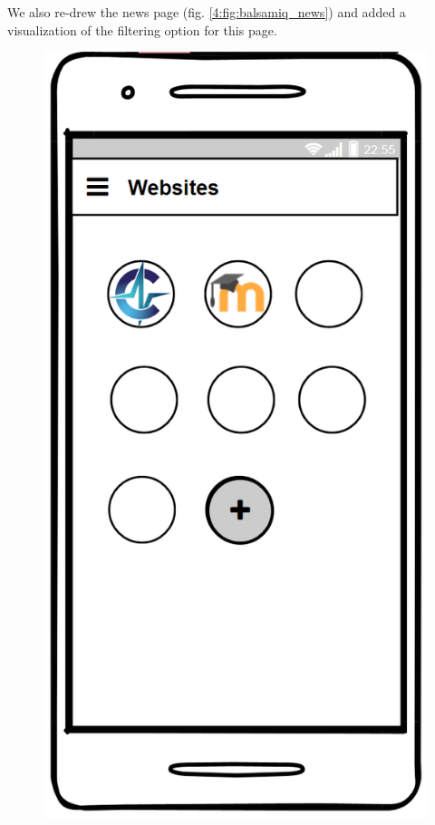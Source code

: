 We also re-drew the news page (fig. \ref{4:fig:balsamiq_news}) and added a visualization of the filtering option for this page.

\begin{figure}[!ht]
    \centering
    \begin{minipage}[t]{0.26\textwidth}
        \captionsetup{justification=centering}
        \includegraphics[width=\textwidth]{figures/app/balsamiq/websites.png}

\end{minipage}
\end{figure}
